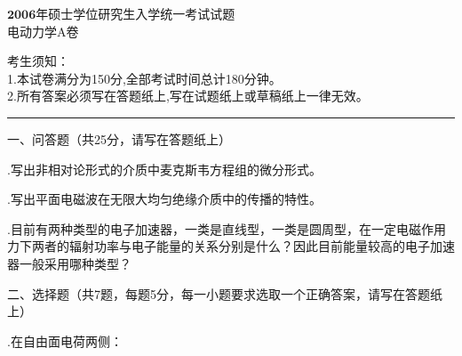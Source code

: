 \begin{center}
	\heiti
	\LARGE{$\boldsymbol{2006}$年硕士学位研究生入学统一考试试题\\
	电动力学A卷}

\end{center}
\noindent
考生须知：\\
1.本试卷满分为150分,全部考试时间总计180分钟。\\
2.所有答案必须写在答题纸上,写在试题纸上或草稿纸上一律无效。

\vspace*{2ex}
\hrule
\vspace*{4ex} 


\setcounter{page}{1}%
\pagestyle{mypagestyle}

\onehalfspacing
\vspace{0.8cm}

\noindent
一、\hspace{0.8em}问答题（共25分，请写在答题纸上）

.\hspace{0.8em}写出非相对论形式的介质中麦克斯韦方程组的微分形式。

.\hspace{0.8em}写出平面电磁波在无限大均匀绝缘介质中的传播的特性。

.\hspace{0.8em}目前有两种类型的电子加速器，一类是直线型，一类是圆周型，在一定电磁作用力下两者的辐射功率与电子能量的关系分别是什么？因此目前能量较高的电子加速器一般采用哪种类型？

\vspace{0.4cm}
\noindent
二、\hspace{0.8em}选择题（共7题，每题5分，每一小题要求选取一个正确答案，请写在答题纸上）

.\hspace{0.8em}在自由面电荷两侧：\vspace{0.2cm}


